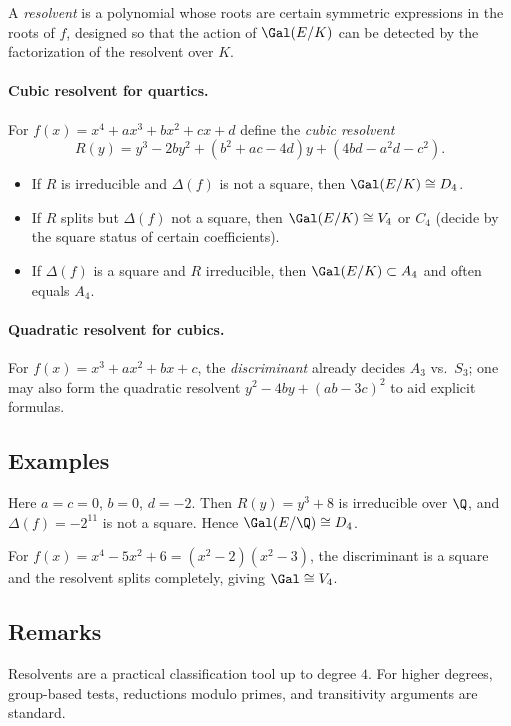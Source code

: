 \begin{definition}
A \emph{resolvent} is a polynomial whose roots are certain symmetric expressions in the roots of $f$, designed so that the action of $\Gal(E/K)$ can be detected by the factorization of the resolvent over $K$.
\end{definition}

\paragraph{Cubic resolvent for quartics.}
For $f(x)=x^4+ax^3+bx^2+cx+d$ define the \emph{cubic resolvent}
\[
R(y)=y^3-2by^2+(b^2+ac-4d)y+(4bd-a^2d-c^2).
\]
\begin{itemize}
\item If $R$ is irreducible and $\Delta(f)$ is not a square, then $\Gal(E/K)\cong D_4$.
\item If $R$ splits but $\Delta(f)$ not a square, then $\Gal(E/K)\cong V_4$ or $C_4$ (decide by the square status of certain coefficients).
\item If $\Delta(f)$ is a square and $R$ irreducible, then $\Gal(E/K)\subset A_4$ and often equals $A_4$.
\end{itemize}

\paragraph{Quadratic resolvent for cubics.}
For $f(x)=x^3+ax^2+bx+c$, the \emph{discriminant} already decides $A_3$ vs.\ $S_3$; one may also form the quadratic resolvent $y^2-4by+(a b-3c)^2$ to aid explicit formulas.

\subsection{Examples}

\begin{example}[Quartic $x^4-2$]
Here $a=c=0$, $b=0$, $d=-2$. Then $R(y)=y^3+8$ is irreducible over $\Q$, and $\Delta(f)=-2^{11}$ is not a square. Hence $\Gal(E/\Q)\cong D_4$.
\end{example}

\begin{example}[A biquadratic]
For $f(x)=x^4-5x^2+6=(x^2-2)(x^2-3)$, the discriminant is a square and the resolvent splits completely, giving $\Gal\cong V_4$.
\end{example}

\subsection{Remarks}
\begin{remark}
Resolvents are a practical classification tool up to degree $4$. For higher degrees, group-based tests, reductions modulo primes, and transitivity arguments are standard.
\end{remark}
